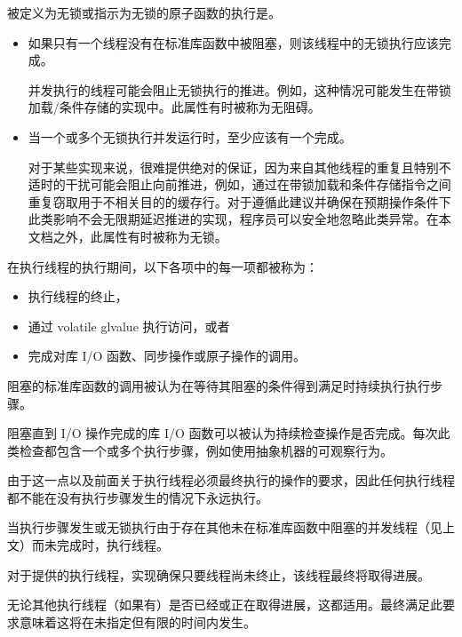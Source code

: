 \pnum
被定义为无锁或指示为无锁的原子函数的执行是。
\begin{itemize}
\item
  如果只有一个线程没有在标准库函数中被阻塞，则该线程中的无锁执行应该完成。
  \begin{note}
    并发执行的线程可能会阻止无锁执行的推进。例如，这种情况可能发生在带锁加载/条件存储的实现中。此属性有时被称为无阻碍。
  \end{note}
\item
  当一个或多个无锁执行并发运行时，至少应该有一个完成。
  \begin{note}
    对于某些实现来说，很难提供绝对的保证，因为来自其他线程的重复且特别不适时的干扰可能会阻止向前推进，例如，通过在带锁加载和条件存储指令之间重复窃取用于不相关目的的缓存行。对于遵循此建议并确保在预期操作条件下此类影响不会无限期延迟推进的实现，程序员可以安全地忽略此类异常。在本文档之外，此属性有时被称为无锁。
  \end{note}
\end{itemize}

\pnum
在执行线程的执行期间，以下各项中的每一项都被称为：
\begin{itemize}
\item 执行线程的终止，
\item 通过 volatile glvalue 执行访问，或者
\item 完成对库 I/O 函数、同步操作或原子操作的调用。
\end{itemize}

\pnum
阻塞的标准库函数的调用被认为在等待其阻塞的条件得到满足时持续执行执行步骤。
\begin{example}
阻塞直到 I/O 操作完成的库 I/O 函数可以被认为持续检查操作是否完成。每次此类检查都包含一个或多个执行步骤，例如使用抽象机器的可观察行为。
\end{example}

\pnum
\begin{note}
由于这一点以及前面关于执行线程必须最终执行的操作的要求，因此任何执行线程都不能在没有执行步骤发生的情况下永远执行。
\end{note}

\pnum
当执行步骤发生或无锁执行由于存在其他未在标准库函数中阻塞的并发线程（见上文）而未完成时，执行线程。

\pnum
{}%
对于提供的执行线程，实现确保只要线程尚未终止，该线程最终将取得进展。
\begin{note}
无论其他执行线程（如果有）是否已经或正在取得进展，这都适用。最终满足此要求意味着这将在未指定但有限的时间内发生。
\end{note}

